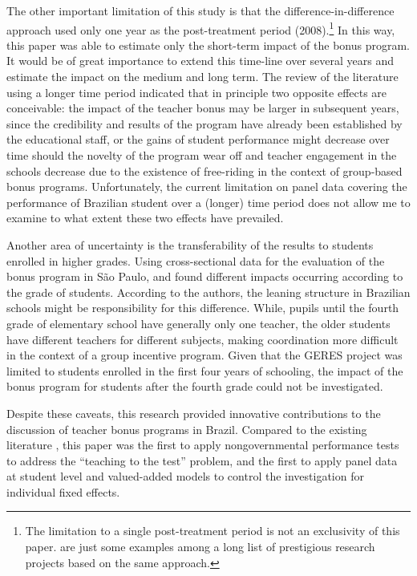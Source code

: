 \documentclass[a4paper, 12pt]{article}
\begin{document}
The other important limitation of this study is that the difference-in-difference approach used only one year as the post-treatment period (2008).\footnote{The limitation to a single post-treatment period is not an exclusivity of this paper. \citet{loyalka2019pay, muralidharan2011teacher, lavy2009performance} are just some examples among a long list of prestigious research projects based on the same approach.} In this way, this paper was able to estimate only the short-term impact of the bonus program. It would be of great importance to extend this time-line over several years and estimate the impact on the medium and long term. The review of the literature using a longer time period \citep[see e.g.][]{barrera2017teacher, imberman2015incentive, glewwe2010teacher} indicated that in principle two opposite effects are conceivable: the impact of the teacher bonus may be larger in subsequent years, since the credibility and results of the program have already been established by the educational staff, or the gains of student performance might decrease over time should the novelty of the program wear off and teacher engagement in the schools decrease due to the existence of free-riding in the context of group-based bonus programs. Unfortunately, the current limitation on panel data covering the performance of Brazilian student over a (longer) time period does not allow me to examine to what extent these two effects have prevailed. 


Another area of uncertainty is the transferability of the results to students enrolled in higher grades. Using cross-sectional data for the evaluation of the bonus program in São Paulo, \citet{lepine2016teacher} and \citet{oshiro2015impacto} found different impacts occurring according to the grade of students. According to the authors, the leaning structure in Brazilian schools might be responsibility for this difference. While, pupils until the fourth grade of elementary school have generally only one teacher, the older students have different teachers for different subjects, making coordination more difficult in the context of a group incentive program. Given that the GERES project was limited to students enrolled in the first four years of schooling, the impact of the bonus program for students after the fourth grade could not be investigated.




Despite these caveats, this research provided innovative contributions to the discussion of teacher bonus programs in Brazil. Compared to the existing literature \citep[see][]{lepine2016teacher, oshiro2015impacto}, this paper was the first to apply nongovernmental performance tests to address the  “teaching to the test” problem, and the first to apply panel data at student level and valued-added models to control the investigation for individual fixed effects.
\end{document}
